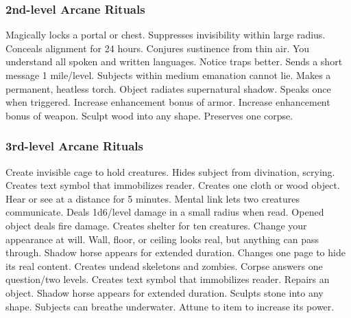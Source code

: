\subsubsection{2nd-level Arcane Rituals}
\begin{rituallist}
     Magically locks a portal or chest.
     Suppresses invisibility within large radius.
     Conceals alignment for 24 hours.
     Conjures sustinence from thin air.
     You understand all spoken and written languages.
     Notice traps better.
     Sends a short message 1 mile/level.
     Subjects within medium emanation cannot lie.
     Makes a permanent, heatless torch.
     Object radiates supernatural shadow.
     Speaks once when triggered.
     Increase enhancement bonus of armor.
     Increase enhancement bonus of weapon.
     Sculpt wood into any shape.
     Preserves one corpse.
\end{rituallist}

\subsubsection{3rd-level Arcane Rituals}
\begin{rituallist}
     Create invisible cage to hold creatures.
     Hides subject from divination, scrying.
     Creates text symbol that immobilizes reader.
     Creates one cloth or wood object.
     Hear or see at a distance for 5 minutes.
     Mental link lets two creatures communicate.
     Deals 1d6/level damage in a small radius when read.
     Opened object deals fire damage.
     Creates shelter for ten creatures.
     Change your appearance at will.
     Wall, floor, or ceiling looks real, but anything can pass through.
     Shadow horse appears for extended duration.
     Changes one page to hide its real content.
     Creates undead skeletons and zombies.
     Corpse answers one question/two levels.
     Creates text symbol that immobilizes reader.
     Repairs an object.
     Shadow horse appears for extended duration.
     Sculpts stone into any shape.
     Subjects can breathe underwater.
     Attune to item to increase its power.
\end{rituallist}

